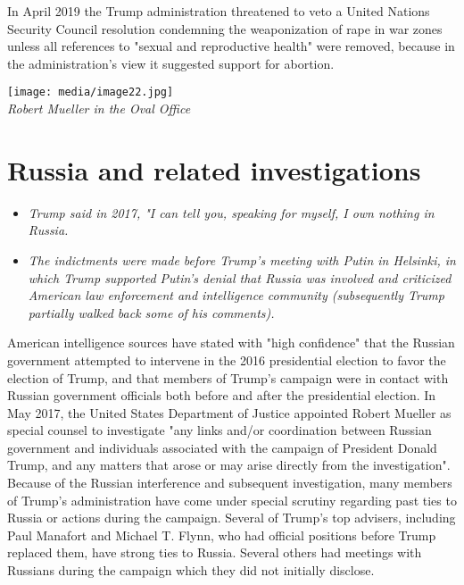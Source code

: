 In April 2019 the Trump administration threatened to veto a United
Nations Security Council resolution condemning the weaponization of rape
in war zones unless all references to "sexual and reproductive health"
were removed, because in the administration's view it suggested support
for abortion.

\texttt{[image: media/image22.jpg]}\\
\emph{Robert Mueller in the Oval Office }

\section{Russia and related
investigations}\label{russia-and-related-investigations}

\begin{itemize}
\item
  \emph{Trump said in 2017, "I can tell you, speaking for myself, I own
  nothing in Russia.}
\item
  \emph{The indictments were made before Trump's meeting with Putin in
  Helsinki, in which Trump supported Putin's denial that Russia was
  involved and criticized American law enforcement and intelligence
  community (subsequently Trump partially walked back some of his
  comments).}
\end{itemize}

American intelligence sources have stated with "high confidence" that
the Russian government attempted to intervene in the 2016 presidential
election to favor the election of Trump, and that members of Trump's
campaign were in contact with Russian government officials both before
and after the presidential election. In May 2017, the United States
Department of Justice appointed Robert Mueller as special counsel to
investigate "any links and/or coordination between Russian government
and individuals associated with the campaign of President Donald Trump,
and any matters that arose or may arise directly from the
investigation". Because of the Russian interference and subsequent
investigation, many members of Trump's administration have come under
special scrutiny regarding past ties to Russia or actions during the
campaign. Several of Trump's top advisers, including Paul Manafort and
Michael T. Flynn, who had official positions before Trump replaced them,
have strong ties to Russia. Several others had meetings with Russians
during the campaign which they did not initially disclose.

